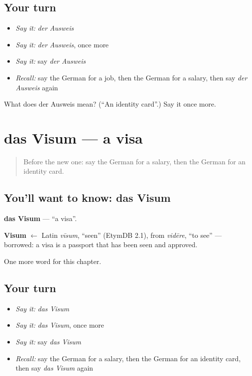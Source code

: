 \subsection*{Your turn}
\begin{itemize}
\raggedright
  \item \emph{Say it:} \emph{der Ausweis}
  \item \emph{Say it:} \emph{der Ausweis}, once more
  \item \emph{Say it:} say \emph{der Ausweis}
  \item \emph{Recall:} say the German for a job, then the German for a salary, then say \emph{der Ausweis} again
\end{itemize}

\begin{tcolorbox}[breakable,colback=teal!4,colframe=teal!35!black,title={Before you move on}]
What does der Ausweis mean? (\textquotedblleft{}An identity card\textquotedblright{}.) Say it once more.
\end{tcolorbox}
\section[das Visum]{das Visum — a visa}

\label{lesson:GE-C155-visum}



\begin{quote}
Before the new one: say the German for a salary, then the German for an identity card.
\end{quote}

\subsection*{You'll want to know: das Visum}
\textbf{das Visum} — \textquotedblleft{}a visa\textquotedblright{}.

\begin{cousinweb}
\textbf{Visum} $\leftarrow$ Latin \emph{vīsum}, \textquotedblleft{}seen\textquotedblright{} (EtymDB 2.1), from \emph{vidēre}, \textquotedblleft{}to see\textquotedblright{} — borrowed: a visa is a passport that has been seen and approved.
\end{cousinweb}

\begin{grammarlens}[title={What you've built}]
One more word for this chapter.
\end{grammarlens}

\subsection*{Your turn}
\begin{itemize}
\raggedright
  \item \emph{Say it:} \emph{das Visum}
  \item \emph{Say it:} \emph{das Visum}, once more
  \item \emph{Say it:} say \emph{das Visum}
  \item \emph{Recall:} say the German for a salary, then the German for an identity card, then say \emph{das Visum} again
\end{itemize}

